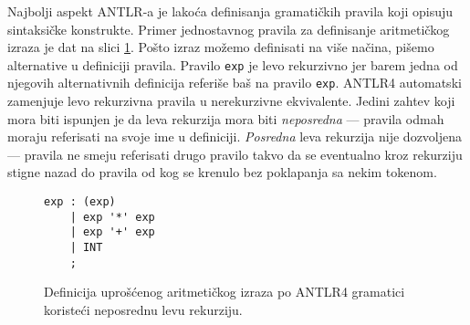 Najbolji aspekt ANTLR-a je lakoća definisanja gramatičkih pravila koji opisuju sintaksičke konstrukte. Primer jednostavnog pravila za definisanje aritmetičkog izraza je dat na slici \ref{fig:ANTLRExpressions}. Pošto izraz možemo definisati na više načina, pišemo alternative u definiciji pravila. Pravilo \texttt{exp} je levo rekurzivno jer barem jedna od njegovih alternativnih definicija referiše baš na pravilo \texttt{exp}. ANTLR4 automatski zamenjuje levo rekurzivna pravila u nerekurzivne ekvivalente. Jedini zahtev koji mora biti ispunjen je da leva rekurzija mora biti \emph{neposredna} --- pravila odmah moraju referisati na svoje ime u definiciji. \emph{Posredna} leva rekurzija nije dozvoljena --- pravila ne smeju referisati drugo pravilo takvo da se eventualno kroz rekurziju stigne nazad do pravila od kog se krenulo bez poklapanja sa nekim tokenom.

\begin{figure}[h!]
\begin{lstlisting}[language={}]
exp : (exp)
    | exp '*' exp
    | exp '+' exp
    | INT
    ;
\end{lstlisting}
\caption{Definicija uprošćenog aritmetičkog izraza po ANTLR4 gramatici koristeći neposrednu levu rekurziju.}
\label{fig:ANTLRExpressions}
\end{figure}
